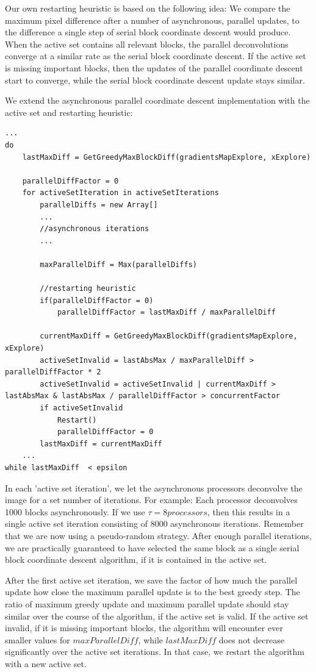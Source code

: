 Our own restarting heuristic is based on the following idea: We compare the maximum pixel difference after a number of asynchronous, parallel updates, to the difference a single step of serial block coordinate descent would produce. When the active set contains all relevant blocks, the parallel deconvolutions converge at a similar rate as the serial block coordinate descent. If the active set is missing important blocks, then the updates of the parallel coordinate descent start to converge, while the serial block coordinate descent update stays similar.

We extend the asynchronous parallel coordinate descent implementation with the active set and restarting heuristic:
\begin{lstlisting}
...
do
	lastMaxDiff = GetGreedyMaxBlockDiff(gradientsMapExplore, xExplore)
	
	parallelDiffFactor = 0
	for activeSetIteration in activeSetIterations
		parallelDiffs = new Array[]
		...
		//asynchronous iterations
		...
		
		maxParallelDiff = Max(parallelDiffs)
		
		//restarting heuristic
		if(parallelDiffFactor = 0)
			parallelDiffFactor = lastMaxDiff / maxParallelDiff
		
		currentMaxDiff = GetGreedyMaxBlockDiff(gradientsMapExplore, xExplore)
		activeSetInvalid = lastAbsMax / maxParallelDiff > parallelDiffFactor * 2
		activeSetInvalid = activeSetInvalid | currentMaxDiff > lastAbsMax & lastAbsMax / parallelDiffFactor > concurrentFactor
		if activeSetInvalid
			Restart()
			parallelDiffFactor = 0
		lastMaxDiff = currentMaxDiff
	...
while lastMaxDiff  < epsilon
\end{lstlisting}

In each 'active set iteration', we let the asynchronous processors deconvolve the image for a set number of iterations. For example: Each processor deconvolves 1000 blocks asynchronously. If we use $\tau = 8 processors$, then this results in a single active set iteration consisting of 8000 asynchronous iterations. Remember that we are now using a pseudo-random strategy. After enough parallel iterations, we are practically guaranteed to have selected the same block as a single serial block coordinate descent algorithm, if it is contained in the active set.
 
After the first active set iteration, we save the factor of how much the parallel update how close the maximum parallel update is to the best greedy step. The ratio of maximum greedy update and maximum parallel update should stay similar over the course of the algorithm, if the active set is valid. If the active set invalid, if it is missing important blocks, the algorithm will encounter ever smaller values for $maxParallelDiff$, while $lastMaxDiff$ does not decrease significantly over the active set iterations. In that case, we restart the algorithm with a new active set.

